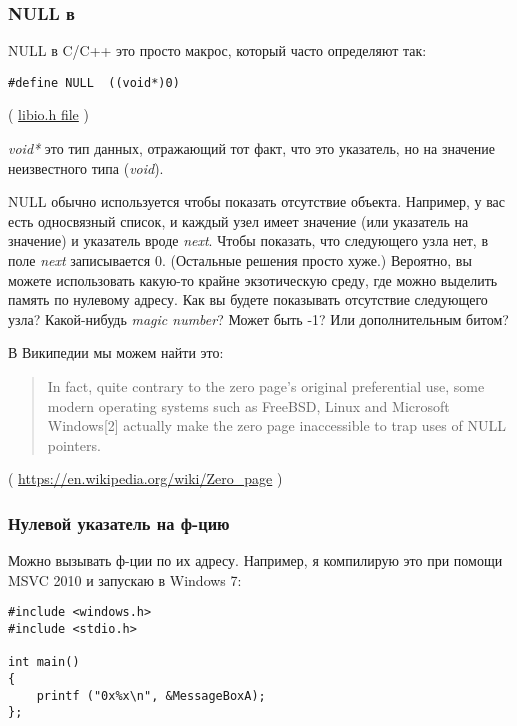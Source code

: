 \subsubsection{NULL в \CCpp}

NULL в C/C++ это просто макрос, который часто определяют так:

\begin{lstlisting}[style=customc]
#define NULL  ((void*)0)
\end{lstlisting}
( \href{https://github.com/wzhy90/linaro_toolchains/blob/8ff8ae680bac04558d10cc9626e12c4c2f6c1348/arm-cortex_a15-linux-gnueabihf/libc/usr/include/libio.h#L70}{libio.h file} )

\emph{void*} это тип данных, отражающий тот факт, что это указатель, но на значение неизвестного типа (\emph{void}).

NULL обычно используется чтобы показать отсутствие объекта.
Например, у вас есть односвязный список, и каждый узел имеет значение (или указатель на значение) и указатель вроде \emph{next}.
Чтобы показать, что следующего узла нет, в поле \emph{next} записывается 0.
(Остальные решения просто хуже.)
Вероятно, вы можете использовать какую-то крайне экзотическую среду, где можно выделить память по нулевому адресу.
Как вы будете показывать отсутствие следующего узла?
Какой-нибудь \emph{magic number}? Может быть -1? Или дополнительным битом?

В Википедии мы можем найти это:

\begin{framed}
\begin{quotation}
In fact, quite contrary to the zero page's original preferential use, some modern operating systems such as FreeBSD, Linux and Microsoft Windows[2] actually make the zero page inaccessible to trap uses of NULL pointers. 
\end{quotation}
\end{framed}
( \url{https://en.wikipedia.org/wiki/Zero_page} )

\subsubsection{Нулевой указатель на ф-цию}

Можно вызывать ф-ции по их адресу.
Например, я компилирую это при помощи MSVC 2010 и запускаю в Windows 7:

\begin{lstlisting}[style=customc]
#include <windows.h>
#include <stdio.h>

int main()
{
	printf ("0x%x\n", &MessageBoxA);
};
\end{lstlisting}

